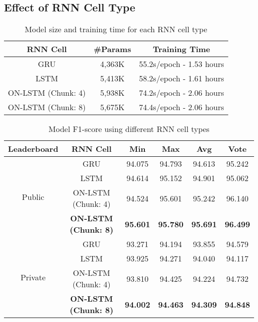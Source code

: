 \documentclass[11pt,a4paper]{article}
\begin{document}
\subsection{Effect of RNN Cell Type}
\label{sec:package_1}

\begin{table*}
\centering
\caption{Model size and training time for each RNN cell type}
\label{tab:p1_1}
\begin{tabular}{|c|c|c|}
\hline
RNN Cell               & \#Params & Training Time            \\ \hline
GRU                    & 4,363K   & 55.2s/epoch - 1.53 hours \\ \hline
LSTM                   & 5,413K   & 58.2s/epoch - 1.61 hours \\ \hline
ON-LSTM (Chunk: 4) & 5,938K   & 74.2s/epoch - 2.06 hours \\ \hline
ON-LSTM (Chunk: 8) & 5,675K   & 74.4s/epoch - 2.06 hours \\ \hline
\end{tabular}
\end{table*}

\begin{table*}
\centering
\caption{Model F1-score using different RNN cell types}
\label{tab:p1_2}
\begin{tabular}{|c|c|c|c|c|c|}
\hline
Leaderboard              & RNN Cell                                                              & Min             & Max             & Avg             & Vote            \\ \hline
\multirow{4}{*}{Public}  & GRU                                                                   & 94.075          & 94.793          & 94.613          & 95.242          \\ \cline{2-6} 
                         & LSTM                                                                  & 94.614          & 95.152          & 94.901          & 95.062          \\ \cline{2-6} 
                         & ON-LSTM (Chunk: 4)          & 94.524          & 95.601          & 95.242          & 96.140          \\ \cline{2-6} 
                         & \textbf{ON-LSTM (Chunk: 8)} & \textbf{95.601} & \textbf{95.780} & \textbf{95.691} & \textbf{96.499} \\ \hline
\multirow{4}{*}{Private} & GRU                                                                   & 93.271          & 94.194          & 93.855          & 94.579          \\ \cline{2-6} 
                         & LSTM                                                                  & 93.925          & 94.271          & 94.040          & 94.117          \\ \cline{2-6} 
                         & ON-LSTM (Chunk: 4)          & 93.810          & 94.425          & 94.224          & 94.732          \\ \cline{2-6} 
                         & \textbf{ON-LSTM (Chunk: 8)} & \textbf{94.002} & \textbf{94.463} & \textbf{94.309} & \textbf{94.848} \\ \hline
\end{tabular}
\end{table*}
\end{document}

